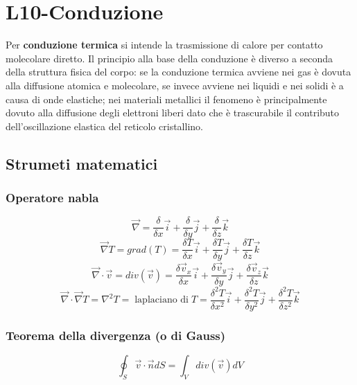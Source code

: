 \section{L10-Conduzione}
Per \textbf{conduzione termica} si intende la trasmissione di calore per contatto molecolare diretto. Il principio alla base della conduzione è diverso a seconda della struttura fisica del corpo: se la conduzione termica avviene nei gas è dovuta alla diffusione atomica e molecolare, se invece avviene nei liquidi e nei solidi è a causa di onde elastiche; nei materiali metallici il fenomeno è principalmente dovuto alla diffusione degli elettroni liberi dato che è trascurabile il contributo dell’oscillazione elastica del reticolo cristallino.
\subsection{Strumeti matematici}
\subsubsection{Operatore nabla}
\[
    \vec{\nabla} = \frac{\delta}{\delta x} \vec{i} + \frac{\delta}{\delta y} \vec{j} + \frac{\delta}{\delta z} \vec{k}
\]
\[
    \vec{\nabla} T = grad(T) = \frac{\delta T}{\delta x} \vec{i} + \frac{\delta T}{\delta y} \vec{j} + \frac{\delta T}{\delta z} \vec{k}
\]
\[
    \vec{\nabla} \cdot  \vec{v} = div(\vec{v}) = \frac{\delta \vec{v}_x}{\delta x} \vec{i} + \frac{\delta \vec{v}_y}{\delta y} \vec{j} + \frac{\delta \vec{v}_z}{\delta z} \vec{k}
\]
\[
    \vec{\nabla} \cdot  \vec{\nabla} T = \nabla^2 T = \;\text{laplaciano di}\;T = \frac{\delta^2 T}{\delta x^2} \vec{i} + \frac{\delta^2 T}{\delta y^2} \vec{j} + \frac{\delta^2 T}{\delta z^2} \vec{k}
\]
\subsubsection{Teorema della divergenza (o di Gauss)}
\[
    \oint_S \vec{v} \cdot \vec{n} dS = \int_{V} div(\vec{v}) dV
\]
